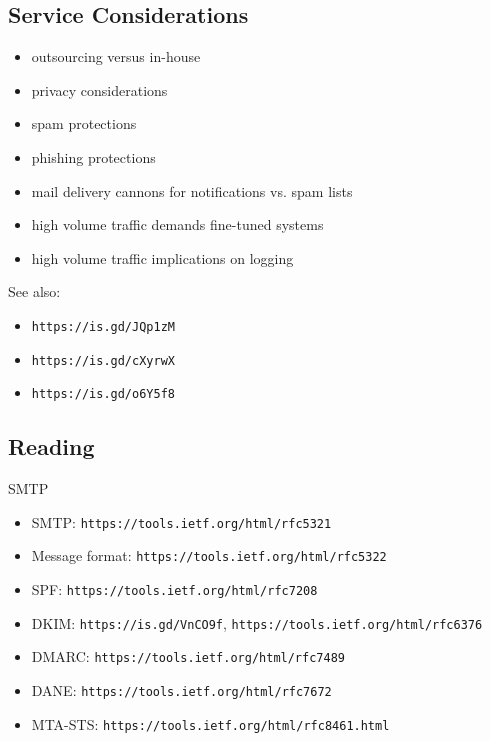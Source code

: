 \documentclass[xga]{xdvislides}
\begin{document}
\subsection{Service Considerations}
\begin{itemize}
	\item outsourcing versus in-house
	\item privacy considerations
	\item spam protections
	\item phishing protections
	\item mail delivery cannons for notifications vs. spam lists
	\item high volume traffic demands fine-tuned systems
	\item high volume traffic implications on logging
\end{itemize}
\vspace{.5in}
See also:
\begin{itemize}
	\item {\tt https://is.gd/JQp1zM}
	\item {\tt https://is.gd/cXyrwX}
	\item {\tt https://is.gd/o6Y5f8}
\end{itemize}

\subsection{Reading}
SMTP
\begin{itemize}
	\item SMTP: {\tt https://tools.ietf.org/html/rfc5321}
	\item Message format: {\tt https://tools.ietf.org/html/rfc5322}
	\item SPF: {\tt https://tools.ietf.org/html/rfc7208}
	\item DKIM: {\tt https://is.gd/VnCO9f}, {\tt https://tools.ietf.org/html/rfc6376}
	\item DMARC: {\tt https://tools.ietf.org/html/rfc7489}
	\item DANE: {\tt https://tools.ietf.org/html/rfc7672}
	\item MTA-STS: {\tt https://tools.ietf.org/html/rfc8461.html}
\end{itemize}
\end{document}

